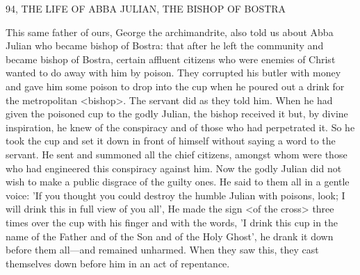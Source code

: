 94, THE LIFE OF ABBA JULIAN, THE
BISHOP OF BOSTRA

This same father of ours, George the archimandrite, also told us
about Abba Julian who became bishop of Bostra: that after he left
the community and became bishop of Bostra, certain affluent
citizens who were enemies of Christ wanted to do away with him by
poison. They corrupted his butler with money and gave him some
poison to drop into the cup when he poured out a drink for the
metropolitan <bishop>. The servant did as they told him. When he
had given the poisoned cup to the godly Julian, the bishop received
it but, by divine inspiration, he knew of the conspiracy and of those
who had perpetrated it. So he took the cup and set it down in front
of himself without saying a word to the servant. He sent and
summoned all the chief citizens, amongst whom were those who had
engineered this conspiracy against him. Now the godly Julian did
not wish to make a public disgrace of the guilty ones. He said to
them all in a gentle voice: 'If you thought you could destroy the
humble Julian with poisons, look; I will drink this in full view of
you all', He made the sign <of the cross> three times over the cup
with his finger and with the words, 'I drink this cup in the name of
the Father and of the Son and of the Holy Ghost', he drank it
down before them all—and remained unharmed. When they saw
this, they cast themselves down before him in an act of repentance.

